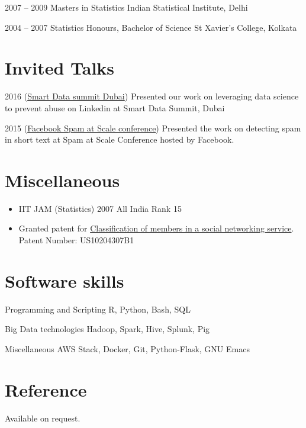 \documentclass{tccv}
\begin{document}
\begin{yearlist}

\item{2007 -- 2009}
     {Masters in Statistics}
     {Indian Statistical Institute, Delhi}

\item{2004 -- 2007}
     {Statistics Honours, Bachelor of Science}
     {St Xavier's College, Kolkata}

\end{yearlist}

\section{Invited Talks}

\begin{yearlist}

\item{2016}
  { (\href{http://wecommer.com/en/conference/2242/speaker/49862}{Smart Data summit Dubai})}
  {Presented our work on leveraging data science to prevent abuse on Linkedin at Smart Data Summit, Dubai}

\item{2015}
     { (\href{https://www.youtube.com/watch?v=fcdnaEACICc}{Facebook Spam at Scale conference})}
     {Presented the work on detecting spam in short text at Spam at Scale Conference hosted by Facebook.}

\end{yearlist}

\section{Miscellaneous}

\begin{itemize}
\item IIT JAM (Statistics) 2007 All India Rank 15
\item Granted patent for \href{https://patents.google.com/patent/US10204307B1/en}{Classification of members in a social networking service}. Patent Number: US10204307B1
\end{itemize}

\section{Software skills}

\begin{factlist}

\item{Programming and Scripting}
  { R, Python, Bash, SQL}
  
\item{Big Data technologies}
  {Hadoop, Spark, Hive, Splunk, Pig}
  
\item{Miscellaneous}
  {AWS Stack, Docker, Git, Python-Flask, GNU Emacs}

\end{factlist}

\section{Reference}
Available on request.
\end{document}
